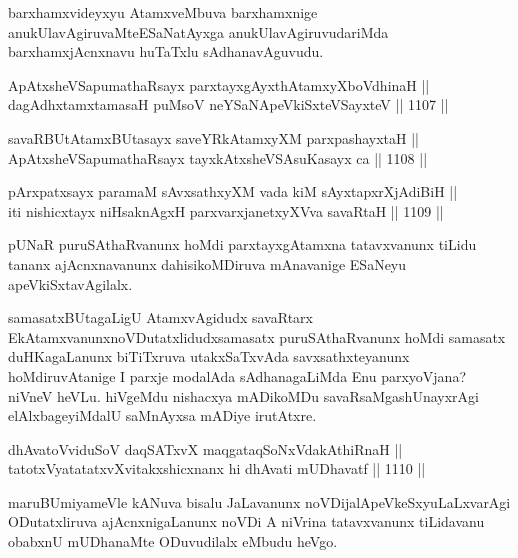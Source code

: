 
\begin{artha}
barxhamxvideyxyu AtamxveMbuva barxhamxnige anukUlavAgiruvaMte\break ESaNatAyxga anukUlavAgiruvudariMda barxhamxjAcnxnavu huTaTxlu sAdhanavAguvudu.
\end{artha}

\begin{shl}
ApAtxsheVSapumathaRsayx parxtayxgAyxthAtamxyXboVdhinaH || \\
dagAdhxtamxtamasaH puMsoV neYSaNA\s peVkiSxteVSayxteV \hfill || 1107 ||  
\end{shl}
				
\begin{shl}
savaRBUtAtamxBUtasayx saveYRkAtamxyXM parxpashayxtaH || \\
ApAtxsheVSapumathaRsayx tayxkAtxsheVSAsuKasayx ca \hfill || 1108 ||  
\end{shl}
				
\begin{shl}
pArxpatxsayx paramaM sAvxsathxyXM vada kiM sAyxtapxrXjAdiBiH || \\
iti nishicxtayx niHsaknAgxH parxvarxjanetxyXVva savaRtaH \hfill || 1109 ||  
\end{shl}

\begin{artha}
pUNaR puruSAthaRvanunx hoMdi parxtayxgAtamxna tatavxvanunx tiLidu tananx ajAcnxnavanunx dahisikoMDiruva mAnavanige ESaNeyu apeVkiSxtavAgilalx.
\end{artha}

\begin{artha}
samasatxBUtagaLigU AtamxvAgidudx savaRtarx EkAtamxvanunx\break noVDutatxlidudxsamasatx puruSAthaRvanunx hoMdi samasatx duHKagaLanunx biTiTxruva utakxSaTxvAda savxsathxteyanunx hoMdiruvAtanige I parxje modalAda sAdhanagaLiMda Enu parxyoVjana? niVneV heVLu. hiVgeMdu nishacxya mADikoMDu savaRsaMgashUnayxrAgi elAlxbageyiMdalU saMnAyxsa mADiye irutAtxre.
\end{artha}


\begin{shl}
dhAvatoV\s viduSoV daqSATxvX maqgataqSoNxVdakAthiRnaH || \\
tatotxVyatatatxvXvitakxshicxnanx hi dhAvati mUDhavatf \hfill || 1110 ||  
\end{shl}

\begin{artha}
maruBUmiyameVle kANuva bisalu JaLavanunx noVDi\break jalApeVkeSxyuLaLxvarAgi ODutatxliruva ajAcnxnigaLanunx noVDi A niVrina tatavxvanunx tiLidavanu obabxnU mUDhanaMte ODuvudilalx eMbudu heVgo.
\end{artha}

